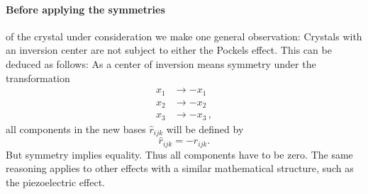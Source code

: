 \paragraph{Before applying the symmetries}
of the crystal under consideration 
we make one general observation: Crystals with an inversion 
center are not subject to either the Pockels effect. 
This can be deduced as follows:
As a center of inversion means symmetry under the transformation 
\begin{equation}
    \begin{split}
    x_1 &\rightarrow -x_1 \\
    x_2 &\rightarrow -x_2 \\
    x_3 &\rightarrow -x_3  \, ,
    \end{split}
\end{equation}
all components in the new bases $\hat{r}_{ijk}$ will be defined 
by 
\begin{equation}
   \hat{r}_{ijk} = - r_{ijk}.
\end{equation}
But symmetry implies equality. Thus all components have to be zero. 
The same reasoning applies to other effects with a similar mathematical 
structure, such as the piezoelectric effect. 


